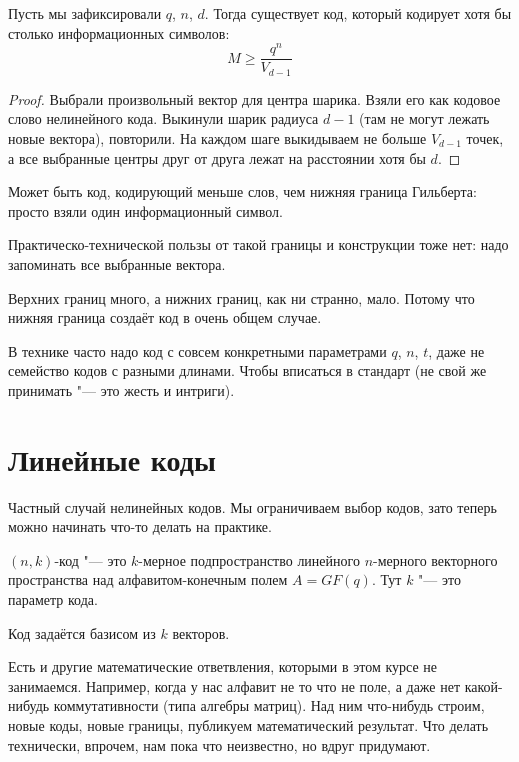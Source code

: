 \begin{lemma}
Пусть мы зафиксировали $q$, $n$, $d$.
Тогда существует код, который кодирует хотя бы столько информационных символов:
\[
M \ge \frac{q^n}{V_{d-1}}
\]
\end{lemma}
\begin{proof}
	Выбрали произвольный вектор для центра шарика.
	Взяли его как кодовое слово нелинейного кода.
	Выкинули шарик радиуса $d-1$ (там не могут лежать новые вектора), повторили.
	На каждом шаге выкидываем не больше $V_{d-1}$ точек,
	а все выбранные центры друг от друга лежат на расстоянии
	хотя бы $d$.
\end{proof}
\begin{Rem}
	Может быть код, кодирующий меньше слов, чем нижняя граница Гильберта:
	просто взяли один информационный символ.
\end{Rem}
\begin{Rem}
	Практическо-технической пользы от такой границы и конструкции тоже нет:
	надо запоминать все выбранные вектора.
\end{Rem}

\begin{Rem}
	Верхних границ много, а нижних границ, как ни странно, мало.
	Потому что нижняя граница создаёт код в очень общем случае.
\end{Rem}
\begin{Rem}
	В технике часто надо код с совсем конкретными
	параметрами $q$, $n$, $t$, даже не семейство кодов с разными длинами.
	Чтобы вписаться в стандарт (не свой же принимать "--- это жесть и интриги).
\end{Rem}

\section{Линейные коды}
Частный случай нелинейных кодов.
Мы ограничиваем выбор кодов, зато теперь можно начинать что-то делать на практике.

\begin{Def}
	$(n, k)$-код "--- это $k$-мерное подпространство
	линейного $n$-мерного векторного пространства
	над алфавитом-конечным полем $A=GF(q)$.
	Тут $k$ "--- это параметр кода.
\end{Def}
\begin{conseq}
	Код задаётся базисом из $k$ векторов.
\end{conseq}
\begin{Rem}
	Есть и другие математические ответвления, которыми в этом курсе не занимаемся.
	Например, когда у нас алфавит не то что не поле,
	а даже нет какой-нибудь коммутативности
	(типа алгебры матриц).
	Над ним что-нибудь строим, новые коды, новые границы,
	публикуем математический результат.
	Что делать технически, впрочем, нам пока что неизвестно,
	но вдруг придумают.
\end{Rem}

